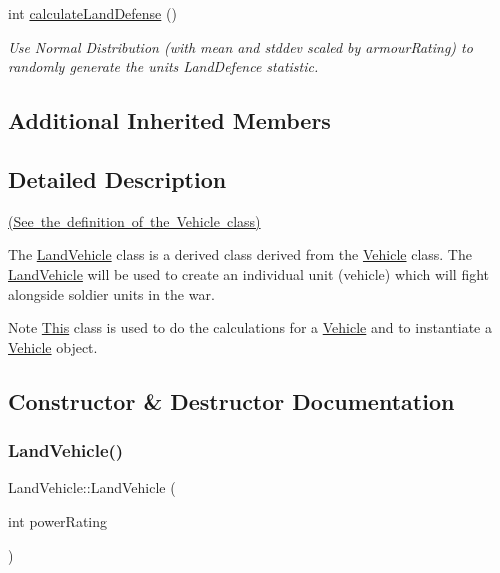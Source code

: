 \begin{DoxyCompactItemize}
int \mbox{\hyperlink{class_land_vehicle_aa294605ab1e7a30d2b62b51aa3957713}{calculate\+Land\+Defense}} ()
\begin{DoxyCompactList}\small\item\em Use Normal Distribution (with mean and stddev scaled by armour\+Rating) to randomly generate the unit\textquotesingle{}s Land\+Defence statistic. \end{DoxyCompactList}\end{DoxyCompactItemize}
\subsection*{Additional Inherited Members}


\subsection{Detailed Description}
\mbox{\hyperlink{_vehicle_8h_source}{(See the definition of the Vehicle class)}}

The \mbox{\hyperlink{class_land_vehicle}{Land\+Vehicle}} class is a derived class derived from the \mbox{\hyperlink{class_vehicle}{Vehicle}} class. The \mbox{\hyperlink{class_land_vehicle}{Land\+Vehicle}} will be used to create an individual unit (vehicle) which will fight alongside soldier units in the war. \begin{DoxyNote}{Note}
\mbox{\hyperlink{class_this}{This}} class is used to do the calculations for a \mbox{\hyperlink{class_vehicle}{Vehicle}} and to instantiate a \mbox{\hyperlink{class_vehicle}{Vehicle}} object. 
\end{DoxyNote}


\subsection{Constructor \& Destructor Documentation}
\mbox{\label{class_land_vehicle_ad87bb4a1d05b0ef2cd076c50194bd612}} 
\subsubsection{\texorpdfstring{LandVehicle()}{LandVehicle()}}
{\footnotesize\ttfamily Land\+Vehicle\+::\+Land\+Vehicle (\begin{DoxyParamCaption}\item[{int}]{power\+Rating }\end{DoxyParamCaption})}



